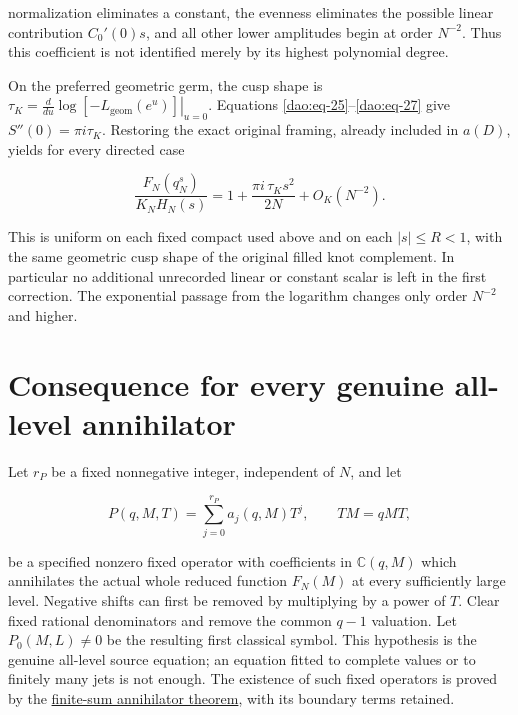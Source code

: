 normalization eliminates a constant, the evenness eliminates the possible linear contribution \(C_0'(0)s\), and all other lower amplitudes begin at order \(N^{-2}\). Thus this coefficient is not identified merely by its highest polynomial degree.

On the preferred geometric germ, the cusp shape is
\(\tau_K=\left.\frac{d}{du}\log[-L_{\mathrm{geom}}(e^u)]\right|_{u=0}\).
Equations \eqref{dao:eq-25}--\eqref{dao:eq-27} give \(S''(0)=\pi i\tau_K\). Restoring the exact original framing, already included in \(a(D)\), yields for every directed case

\begin{equation}\label{dao:eq-27b}
\frac{F_N(q_N^s)}{K_NH_N(s)}
    =1+\frac{\pi i\,\tau_K s^2}{2N}
                         +O_K(N^{-2}).
\end{equation}

This is uniform on each fixed compact used above and on each \(|s|\le R<1\), with the same geometric cusp shape of the original filled knot complement. In particular no additional unrecorded linear or constant scalar is left in the first correction. The exponential passage from the logarithm changes only order \(N^{-2}\) and higher.

\section{Consequence for every genuine all-level annihilator}\label{dao:sec-8}

Let \(r_P\) be a fixed nonnegative integer, independent of \(N\), and let

\begin{equation}\label{dao:eq-28}
P(q,M,T)=\sum_{j=0}^{r_P}a_j(q,M)T^j,
       \qquad TM=qMT,
\end{equation}

be a specified nonzero fixed operator with coefficients in \(\mathbb C(q,M)\) which annihilates the actual whole reduced function \(F_N(M)\) at every sufficiently large level. Negative shifts can first be removed by multiplying by a power of \(T\). Clear fixed rational denominators and remove the common \(q-1\) valuation. Let \(P_0(M,L)\ne0\) be the resulting first classical symbol. This hypothesis is the genuine all-level source equation; an equation fitted to complete values or to finitely many jets is not enough. The existence of such fixed operators is proved by the \href{https://sashakolpakov.github.io/murakamis_dream/notes/finite_sum_annihilator.html}{finite-sum annihilator theorem}, with its boundary terms retained.

